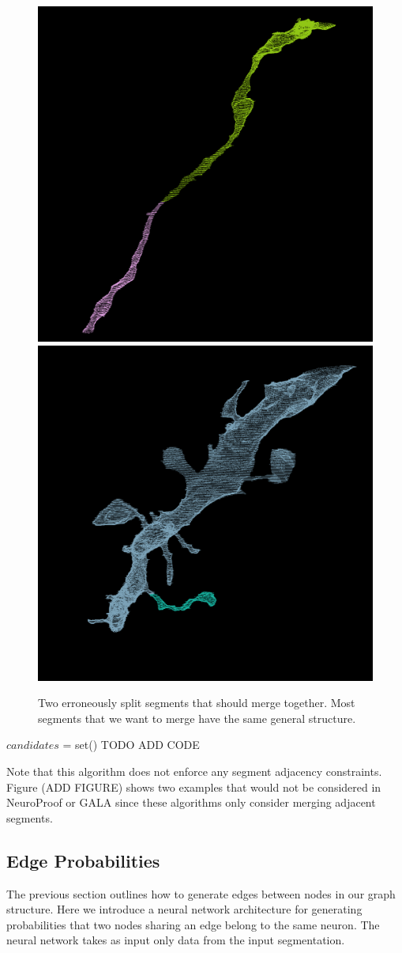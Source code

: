 \begin{figure}[t]
	\centering
	\includegraphics[width=0.42\linewidth]{./figures/merge_candidate1.png}
	\hspace{0.085\linewidth}
	\includegraphics[width=0.42\linewidth]{./figures/merge_candidate2.png}
	\caption{Two erroneously split segments that should merge together. Most segments that we want to merge have the same general structure.}
	\label{fig:merge_candidates}
\end{figure}


\begin{algorithmic}
			\State $candidates$ = set()
				\State TODO ADD CODE
			\EndFor
		\EndFor
	\EndFunction
\end{algorithmic}

Note that this algorithm does not enforce any segment adjacency constraints.
Figure (ADD FIGURE) shows two examples that would not be considered in NeuroProof or GALA since these algorithms only consider merging adjacent segments.

\subsection{Edge Probabilities}

The previous section outlines how to generate edges between nodes in our graph structure. 
Here we introduce a neural network architecture for generating probabilities that two nodes sharing an edge belong to the same neuron. 
The neural network takes as input only data from the input segmentation. 


